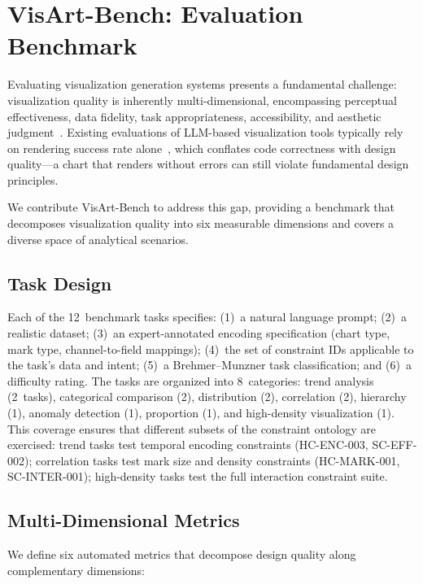 \section{VisArt-Bench: Evaluation Benchmark}
\label{sec:bench}

Evaluating visualization generation systems presents a fundamental challenge: visualization quality is inherently multi-dimensional, encompassing perceptual effectiveness, data fidelity, task appropriateness, accessibility, and aesthetic judgment~\cite{huang2009measuring}. Existing evaluations of LLM-based visualization tools typically rely on rendering success rate alone~\cite{dibia2023lida,maddigan2023chat2vis}, which conflates code correctness with design quality---a chart that renders without errors can still violate fundamental design principles.

We contribute VisArt-Bench to address this gap, providing a benchmark that decomposes visualization quality into six measurable dimensions and covers a diverse space of analytical scenarios.

\subsection{Task Design}

Each of the 12~benchmark tasks specifies: (1)~a natural language prompt; (2)~a realistic dataset; (3)~an expert-annotated encoding specification (chart type, mark type, channel-to-field mappings); (4)~the set of constraint IDs applicable to the task's data and intent; (5)~a Brehmer--Munzner task classification; and (6)~a difficulty rating. The tasks are organized into 8~categories: trend analysis (2~tasks), categorical comparison (2), distribution (2), correlation (2), hierarchy (1), anomaly detection (1), proportion (1), and high-density visualization (1). This coverage ensures that different subsets of the constraint ontology are exercised: trend tasks test temporal encoding constraints (HC-ENC-003, SC-EFF-002); correlation tasks test mark size and density constraints (HC-MARK-001, SC-INTER-001); high-density tasks test the full interaction constraint suite.

\subsection{Multi-Dimensional Metrics}

We define six automated metrics that decompose design quality along complementary dimensions:


